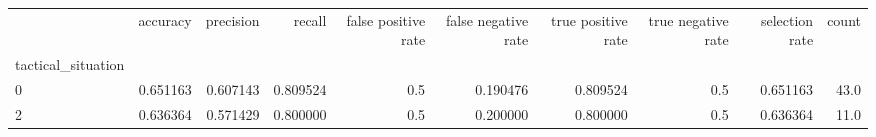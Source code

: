 \begin{tabular}{lrrrrrrrrr}
\toprule
{} &  accuracy &  precision &    recall &  false positive rate &  false negative rate &  true positive rate &  true negative rate &  selection rate &  count \\
tactical\_situation &           &            &           &                      &                      &                     &                     &                 &        \\
\midrule
0                  &  0.651163 &   0.607143 &  0.809524 &                  0.5 &             0.190476 &            0.809524 &                 0.5 &        0.651163 &   43.0 \\
2                  &  0.636364 &   0.571429 &  0.800000 &                  0.5 &             0.200000 &            0.800000 &                 0.5 &        0.636364 &   11.0 \\
\bottomrule
\end{tabular}
